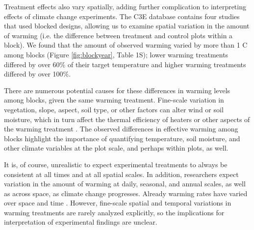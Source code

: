 \documentclass{article}
\begin{document}
\par Treatment effects also vary spatially, adding further complication to interpreting effects of climate change experiments. The C3E database contains four studies that used blocked designs, allowing us to examine spatial variation in the amount of warming (i.e. the difference between treatment and control plots within a block). We found that the amount of observed warming varied by more than 1 \degree C among blocks (Figure \ref{fig:blockyear}, Table 1S); lower warming treatments differed by over 60\% of their target temperature and higher warming treatments differed by over 100\%. %
\par There are numerous potential causes for these differences in warming levels among blocks, given the same warming treatment. Fine-scale variation in vegetation, slope, aspect, soil type, or other factors can alter wind or soil moisture, which in turn affect the thermal efficiency of heaters or other aspects of the warming treatment \citep{peterjohn1993,kimball2005,kimball2008,hoeppner2012,rollinson2015}. The observed differences in effective warming among blocks highlight the importance of quantifying temperature, soil moisture, and other climate variables at the plot scale, and perhaps within plots, as well. 

\par It is, of course, unrealistic to expect experimental treatments to always be consistent at all times and at all spatial scales. In addition, researchers expect variation in the amount of warming at daily, seasonal, and annual scales, as well as across space, as climate change progresses. Already warming rates have varied over space and time \citep{ipcc2013}. However, fine-scale spatial and temporal variations in warming treatments are rarely analyzed explicitly, so the implications for interpretation of experimental findings are unclear. %
\end{document}
